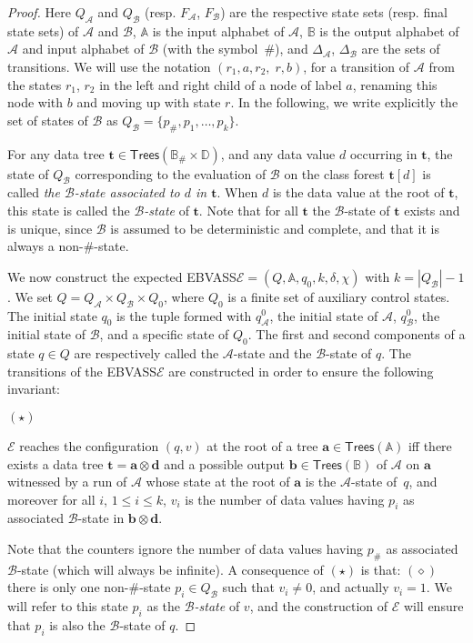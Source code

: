 \documentclass{CSML}
\newcommand\ebvass{\textup{EBVASS}\xspace}
\newcommand\A{\ensuremath{\mathbb{A}}\xspace}
\newcommand\B{\mathbb{B}}
\newcommand\D{\mathbb{D}}
\newcommand\Aa{\mathcal{A}}
\newcommand\Ba{\mathcal{B}}
\newcommand\Ea{\mathcal{E}}
\newcommand\Trees{\mathsf{Trees}}
\newcommand\tree{\boldsymbol{t}}
\newcommand\atree{\boldsymbol{a}}
\newcommand\btree{\boldsymbol{b}}
\newcommand\dtree{\boldsymbol{d}}
\newcommand\rootstate{$\Ba$-state\xspace}
\begin{document}
\begin{proof}
Here $Q_\Aa$ and $Q_\Ba$ (resp. $F_\Aa$, $F_\Ba$) are the respective state sets
(resp. final state sets) of $\Aa$ and $\Ba$, 
$\A$ is the input alphabet of $\Aa$, 
$\B$ is the output alphabet of $\Aa$ and input alphabet of $\Ba$
(with the symbol~$\#$),
and $\Delta_\Aa$, $\Delta_\Ba$ are the sets of transitions.
We will use the notation  
$(r_1, a, r_2,\; r, b)$,
for a transition of $\Aa$ from the states $r_1$, $r_2$ in the left and right child 
of a node of label $a$, renaming this node with $b$ and moving up with state $r$.
In the following, we write explicitly the set of states of $\Ba$ 
as $Q_\Ba = \{ p_\#,p_1,\ldots,p_k \}$.

For any data tree $\tree\in\Trees(\B_\# \times\D)$, and any data value $d$ occurring in $\tree$, 
the state of $Q_\Ba$ corresponding to the evaluation of $\Ba$ on the class forest $\tree[d]$
is called \emph{the $\Ba$-state associated to $d$ in $\tree$}. 
When $d$ is the data value at the root of $\tree$,
this state is called the \emph{\rootstate{}} of $\tree$.
Note that for all $\tree$ the \rootstate{} of $\tree$ exists and is unique,
since $\Ba$ is assumed to be deterministic and complete, 
and that it is always a non-$\#$-state.

We now construct the expected \ebvass $\Ea = (Q,\A,q_0,k,\delta,\chi)$ 
with $k = |Q_\Ba|-1$.
We set $Q = Q_\Aa \times Q_\Ba \times Q_0$, 
where $Q_0$ is a finite set of auxiliary control states.
The initial state $q_0$ is the tuple formed with $q^0_{\Aa}$, the initial state of $\Aa$,
$q^0_{\Ba}$, the initial state of $\Ba$, and a specific state of $Q_0$.
The first and second components of a state $q\in Q$
are respectively called the $\Aa$-state and the 
\rootstate of $q$.
The transitions of the \ebvass $\Ea$ are constructed in order to ensure
the following invariant:

\medskip
\noindent
\hspace{-1mm}$(\star)$\hspace{2mm}\parbox[t]{128mm}{$\Ea$ reaches the configuration $(q,v)$ at the
  root of a tree $\atree \in \Trees(\A)$ 
  iff there exists a data tree $\tree=\atree\otimes\dtree$
  and a possible output $\btree \in \Trees(\B)$ of $\Aa$ on $\atree$ 
  witnessed by a run of $\Aa$ whose state at the root of $\atree$ is the $\Aa$-state of~$q$,   
  and moreover for all $i$, $1 \leq i \leq k$,
  $v_i$ is the number of data values having $p_i$ as associated $\Ba$-state 
  in $\btree\otimes\dtree$.}  
\medskip

\noindent Note that the counters ignore the number of data values having $p_\#$ as associated $\Ba$-state 
(which will always be infinite).
A consequence of $(\star)$ is that:
$(\diamond)$ there is only one non-$\#$-state $p_i \in Q_\Ba$ such that $v_i \neq 0$, and actually $v_i = 1$.
We will refer to this state $p_i$ as the \emph{\rootstate} of $v$,
and the construction of $\Ea$ will ensure that $p_i$ is also the \rootstate of $q$.



\end{proof}
\end{document}
